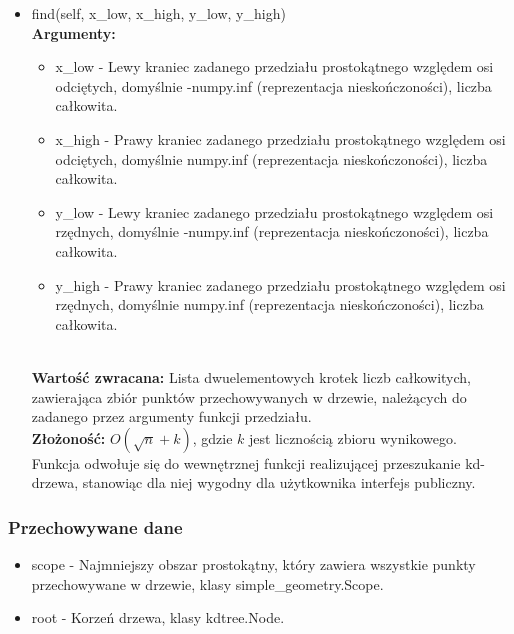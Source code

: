 \documentclass{article}
\begin{document}
\begin{itemize}
                    \item find(self,  x\_low, x\_high, y\_low, y\_high)\\
                        \textbf{Argumenty:} \begin{itemize}
                            \item x\_low - Lewy kraniec zadanego przedziału prostokątnego względem osi odciętych, domyślnie -numpy.inf (reprezentacja nieskończoności), liczba całkowita. 
                            \item x\_high - Prawy kraniec zadanego przedziału prostokątnego względem osi odciętych, domyślnie numpy.inf (reprezentacja nieskończoności), liczba całkowita. 
                            \item y\_low - Lewy kraniec zadanego przedziału prostokątnego względem osi rzędnych, domyślnie -numpy.inf (reprezentacja nieskończoności), liczba całkowita. 
                            \item y\_high - Prawy kraniec zadanego przedziału prostokątnego względem osi rzędnych, domyślnie numpy.inf (reprezentacja nieskończoności), liczba całkowita. 
                        \end{itemize}\\
                        \textbf{Wartość zwracana:} Lista dwuelementowych krotek liczb całkowitych, zawierająca zbiór punktów przechowywanych w drzewie, należących do zadanego przez argumenty funkcji przedziału. \\
                        \textbf{Złożoność: } $O(\sqrt{n}+k)$, gdzie $k$ jest licznością zbioru wynikowego.\\
                        Funkcja odwołuje się do wewnętrznej funkcji realizującej przeszukanie kd-drzewa, stanowiąc dla niej wygodny dla użytkownika interfejs publiczny. 
                    
                \end{itemize}

            \subsubsection{Przechowywane dane}
            \begin{itemize}
                \item scope - Najmniejszy obszar prostokątny, który zawiera wszystkie punkty przechowywane w drzewie, klasy simple\_geometry.Scope.
                \item root - Korzeń drzewa, klasy kdtree.Node.
            \end{itemize}
            
\end{document}
